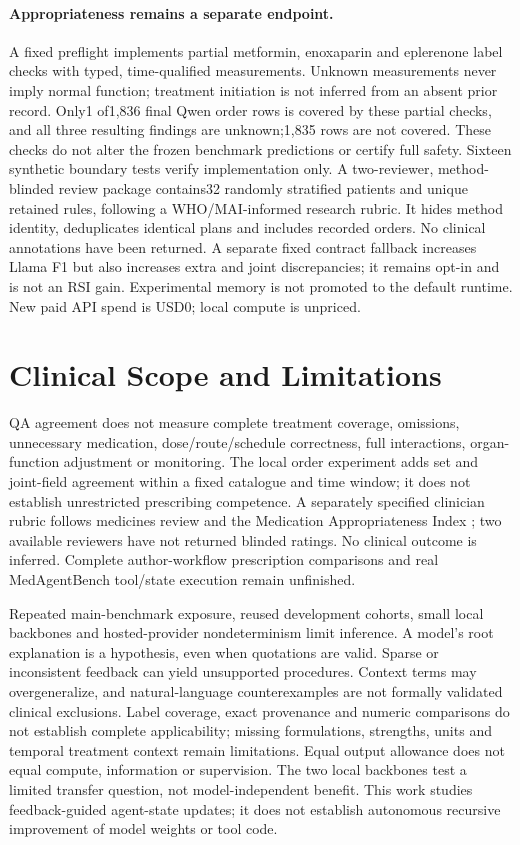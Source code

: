 \paragraph{Appropriateness remains a separate endpoint.} A fixed preflight implements partial metformin, enoxaparin and eplerenone label checks with typed, time-qualified measurements\citep{labelchecks}. Unknown measurements never imply normal function; treatment initiation is not inferred from an absent prior record. Only1 of1,836 final Qwen order rows is covered by these partial checks, and all three resulting findings are unknown;1,835 rows are not covered. These checks do not alter the frozen benchmark predictions or certify full safety. Sixteen synthetic boundary tests verify implementation only. A two-reviewer, method-blinded review package contains32 randomly stratified patients and unique retained rules, following a WHO/MAI-informed research rubric\citep{whoprescribing,mai}. It hides method identity, deduplicates identical plans and includes recorded orders. No clinical annotations have been returned. A separate fixed contract fallback increases Llama F1 but also increases extra and joint discrepancies; it remains opt-in and is not an RSI gain. Experimental memory is not promoted to the default runtime. New paid API spend is USD0; local compute is unpriced.

\section{Clinical Scope and Limitations}
QA agreement does not measure complete treatment coverage, omissions, unnecessary medication, dose/route/schedule correctness, full interactions, organ-function adjustment or monitoring. The local order experiment adds set and joint-field agreement within a fixed catalogue and time window; it does not establish unrestricted prescribing competence. A separately specified clinician rubric follows medicines review and the Medication Appropriateness Index \citep{nice,mai}; two available reviewers have not returned blinded ratings. No clinical outcome is inferred. Complete author-workflow prescription comparisons and real MedAgentBench tool/state execution remain unfinished.

Repeated main-benchmark exposure, reused development cohorts, small local backbones and hosted-provider nondeterminism limit inference. A model's root explanation is a hypothesis, even when quotations are valid. Sparse or inconsistent feedback can yield unsupported procedures. Context terms may overgeneralize, and natural-language counterexamples are not formally validated clinical exclusions. Label coverage, exact provenance and numeric comparisons do not establish complete applicability; missing formulations, strengths, units and temporal treatment context remain limitations. Equal output allowance does not equal compute, information or supervision. The two local backbones test a limited transfer question, not model-independent benefit. This work studies feedback-guided agent-state updates; it does not establish autonomous recursive improvement of model weights or tool code.

